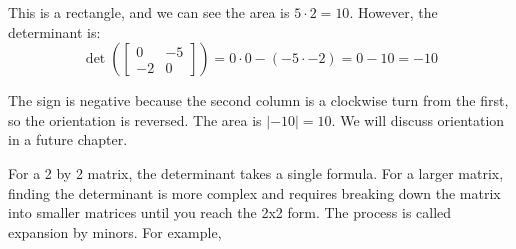 \begin{Answer}[ref = geo_det]
\begin{enumerate}

    This is a rectangle, and we can see the area is $5 \cdot 2 = 10$. However, 
    the determinant is:
    $$\det \left( \begin{bmatrix}
        0 & -5\\
        -2 & 0
    \end{bmatrix} \right) = 0 \cdot 0 - \left( -5 \cdot -2 \right) = 0 - 10 = 
    -10$$

    The sign is negative because the second column is a clockwise turn from the first, so the orientation is reversed. The area is $|-10| = 10$. We will discuss orientation in a future chapter. 
\end{enumerate}
\end{Answer}
For a 2 by 2 matrix, the determinant takes a single formula. For a larger matrix, 
finding the determinant is more complex and requires breaking down the matrix 
into smaller matrices until you reach the 2x2 form. The process is called 
expansion by minors. 
For example, 
